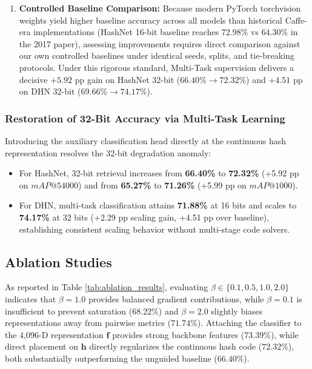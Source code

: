 \documentclass[10pt,conference]{IEEEtran}
\begin{document}
\begin{enumerate}
    \item \textbf{Controlled Baseline Comparison:}
    Because modern PyTorch torchvision weights yield higher baseline accuracy across all models than historical Caffe-era implementations (HashNet 16-bit baseline reaches $72.98\%$ vs $64.30\%$ in the 2017 paper), assessing improvements requires direct comparison against our own controlled baselines under identical seeds, splits, and tie-breaking protocols. Under this rigorous standard, Multi-Task supervision delivers a decisive $+5.92$ pp gain on HashNet 32-bit ($66.40\% \to 72.32\%$) and $+4.51$ pp on DHN 32-bit ($69.66\% \to 74.17\%$).
\end{enumerate}

\subsubsection{Restoration of 32-Bit Accuracy via Multi-Task Learning}
Introducing the auxiliary classification head directly at the continuous hash representation resolves the 32-bit degradation anomaly:
\begin{itemize}
    \item For HashNet, 32-bit retrieval increases from \textbf{66.40\%} to \textbf{72.32\%} (+5.92 pp on $mAP@54000$) and from \textbf{65.27\%} to \textbf{71.26\%} (+5.99 pp on $mAP@1000$).
    \item For DHN, multi-task classification attains \textbf{71.88\%} at 16 bits and scales to \textbf{74.17\%} at 32 bits (+2.29 pp scaling gain, +4.51 pp over baseline), establishing consistent scaling behavior without multi-stage code solvers.
\end{itemize}

\subsection{Ablation Studies}
As reported in Table \ref{tab:ablation_results}, evaluating $\beta \in \{0.1, 0.5, 1.0, 2.0\}$ indicates that $\beta = 1.0$ provides balanced gradient contributions, while $\beta = 0.1$ is insufficient to prevent saturation ($68.22\%$) and $\beta = 2.0$ slightly biases representations away from pairwise metrics ($71.74\%$). Attaching the classifier to the 4,096-D representation $\mathbf{f}$ provides strong backbone features ($73.39\%$), while direct placement on $\mathbf{h}$ directly regularizes the continuous hash code ($72.32\%$), both substantially outperforming the unguided baseline ($66.40\%$).
\end{document}
